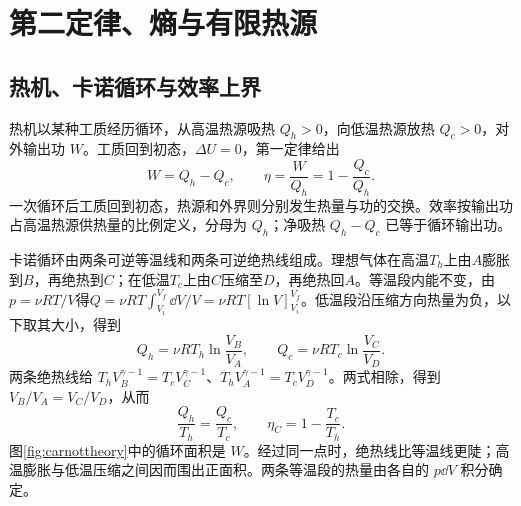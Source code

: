 \chapter{第二定律、熵与有限热源}

\section{热机、卡诺循环与效率上界}
\label{th:carnot}
热机以某种工质经历循环，从高温热源吸热 $Q_h>0$，向低温热源放热 $Q_c>0$，对外输出功 $W$。工质回到初态，$\Delta U=0$，第一定律给出
\[
 W=Q_h-Q_c,\qquad \eta=\frac W{Q_h}=1-\frac{Q_c}{Q_h}.
\]
一次循环后工质回到初态，热源和外界则分别发生热量与功的交换。效率按输出功占高温热源供热量的比例定义，分母为 $Q_h$；净吸热 $Q_h-Q_c$ 已等于循环输出功。

卡诺循环由两条可逆等温线和两条可逆绝热线组成。理想气体在高温$T_h$上由$A$膨胀到$B$，再绝热到$C$；在低温$T_c$上由$C$压缩至$D$，再绝热回$A$。等温段内能不变，由$p=\nu RT/V$得$Q=\nu RT\int_{V_i}^{V_f}\dd V/V=\nu RT[\ln V]_{V_i}^{V_f}$。低温段沿压缩方向热量为负，以下取其大小，得到
\[
 Q_h=\nu RT_h\ln\frac{V_B}{V_A},\qquad
 Q_c=\nu RT_c\ln\frac{V_C}{V_D}.
\]
两条绝热线给 $T_hV_B^{\gamma-1}=T_cV_C^{\gamma-1}$、$T_hV_A^{\gamma-1}=T_cV_D^{\gamma-1}$。两式相除，得到 $V_B/V_A=V_C/V_D$，从而
\begin{equation}\label{eq:carnotratio}
 \frac{Q_h}{T_h}=\frac{Q_c}{T_c},\qquad \eta_C=1-\frac{T_c}{T_h}.
\end{equation}
图\ref{fig:carnottheory}中的循环面积是 $W$。经过同一点时，绝热线比等温线更陡；高温膨胀与低温压缩之间因而围出正面积。两条等温段的热量由各自的 $p\dd V$ 积分确定。

